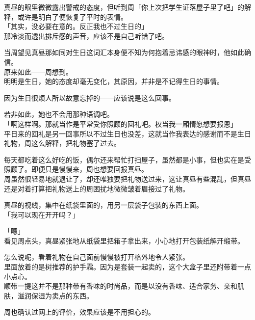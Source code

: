 真昼的眼里微微露出警戒的态度，但听到周「你上次把学生证落屋子里了吧」的解释，或许是明白了便恢复了平时的表情。\\

「其实，没必要在意的。反正我也不过生日的」\\

那冷淡而透出排斥感的声音，应该不是自己听错了吧。

当周望见真昼那如同对生日这词汇本身便不知为何抱着忌讳感的眼神时，他如此确信。\\

原来如此——周想到。\\

明明是生日，她的态度却毫无变化，其原因，并非是不记得生日的事情。

因为生日很烦人所以故意忘掉的——应该说是这么回事。

若非如此，她也不会用那种语调吧。\\

「啊这样啊。那就当作是平常受你照顾的回礼吧。权当我一厢情愿想要报恩」\\

平日来的回礼是另一回事所以不过生日也没差，这就当作我表达的感谢而不是生日礼物，周这么解释，把礼物塞了过去。

每天都吃着这么好吃的饭，偶尔还来帮忙打扫屋子，虽然都是小事，但也实在是受照顾了。即便只是慢慢来，周也想要回报真昼。\\

周虽然很轻易地就退让了，却还唯独要把礼物送过来，这让真昼有些混乱，但真昼还是对着打算把礼物送上的周困扰地微微皱着眉接过了礼物。

真昼的视线，集中在纸袋里面的，用另一层袋子包装的东西上面。\\

「我可以现在开开吗？」

「嗯」\\

看见周点头，真昼紧张地从纸袋里把箱子拿出来，小心地打开包装纸解开缎带。

怎么说呢，看着礼物在自己面前慢慢被打开格外地令人紧张。\\

里面放着的是树推荐的护手霜。因为是套装一起卖的，这个大盒子里还附带着一点小点心。\\

顺带一提这并不是那种带有香味的时尚品，而是以没有香味、适合家务、亲和肌肤，滋润保湿为卖点的东西。

周也确认过网上的评价，效果应该是不用担心的。\\

